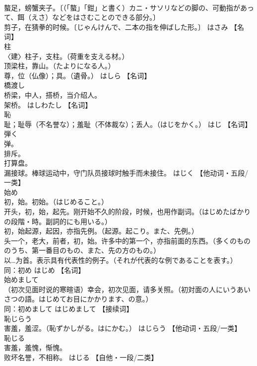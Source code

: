 \documentclass[8pt]{extreport}
\begin{document}
\begin{CJK}{UTF8}{min}
\\	螯足，螃蟹夹子。〔（「螯」「鉗」と書く）カニ・サソリなどの脚の、可動指があって、餌（えさ）などをはさむことのできる部分。〕 
\\	剪子，在猜拳的时候。〔じゃんけんで、二本の指を伸ばした形。〕	はさみ		【名词】
\\	柱	
\\	〈建〉柱子，支柱。（荷重を支える材。） 
\\	顶梁柱，靠山。（たよりになる人。） 
\\	尊，位（仏像）；具。（遺骨。）	はしら		【名词】
\\	橋渡し	
\\	桥梁，中人，搭桥，当介绍人。 
\\	架桥。	はしわたし		【名词】
\\	恥	
\\	耻；耻辱（不名誉な）；羞耻（不体裁な）；丢人。（はじをかく。）	はじ		【名词】
\\	弾く	
\\	弹。 
\\	排斥。 
\\	打算盘。 
\\	漏接球。棒球运动中，守门队员接球时触手而未接住。	はじく		【他动词・五段/一类】
\\	始め	
\\	初，始。初始。（はじめること。） 
\\	开头，初，始，起先。刚开始不久的阶段，时候，也用作副词。（はじめたばかりの段階・時。副詞的にも用いる。） 
\\	初，始起源，起因，亦指先例。（起源。起こり。また、先例。） 
\\	头一个，老大，前者，初，始。许多中的第一个，亦指前面的东西。（多くのもののうち、第一番目のもの、また、先の方のもの。） 
\\	以…为首。表示具有代表性的例子。（それが代表的な例であることを表す。） 
\\	同：初め	はじめ		【名词】
\\	始めまして	
\\	（初次见面时说的寒暄语）幸会，初次见面，请多关照。（初対面の人にいうあいさつの語。はじめてお目にかかります、の意。） 
\\	同：初めまして	はじめまして		【接续词】
\\	恥じらう	
\\	害羞，羞涩。（恥ずかしがる。はにかむ。）	はじらう		【他动词・五段/一类】
\\	恥じる	
\\	害羞，羞愧，惭愧。 
\\	败坏名誉，不相称。	はじる		【自他・一段/二类】

\end{CJK}
\end{document}
